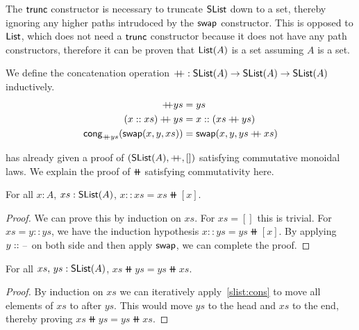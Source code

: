 The $\operatorname{\mathsf{trunc}}$ constructor is necessary to truncate $\operatorname{\mathsf{SList}}$ down to a set,
thereby ignoring any higher paths intrudoced by the $\operatorname{\mathsf{swap}}$ constructor.
This is opposed to $\operatorname{\mathsf{List}}$, which does not need a $\operatorname{\mathsf{trunc}}$ constructor
because it does not have any path constructors, therefore it can be proven that $\operatorname{\mathsf{List}}(A)$
is a set assuming $A$ is a set.

\begin{definition}[Concatenation]
    We define the concatenation operation $\mathbin{+\kern -0.4em+} : \operatorname{\mathsf{SList}}(A) \to \operatorname{\mathsf{SList}}(A) \to \operatorname{\mathsf{SList}}(A)$
    inductively.
    \begin{align*}
        [] \doubleplus ys & = ys \\
        (x :: xs) \doubleplus ys & = x :: (xs \doubleplus ys) \\
        \term{cong}_{\doubleplus ys}(\term{swap}(x, y, xs)) & = \term{swap}(x, y, ys \doubleplus xs)
    \end{align*}
\end{definition}

\cite{choudhuryFreeCommutativeMonoids2023} has already given a proof of $(\operatorname{\mathsf{SList}}(A), \mathbin{+\kern -0.4em+}, [])$
satisfying commutative monoidal laws. We explain the proof of $\doubleplus$ satisfying commutativity here.

\begin{lemma}\label{slist:cons}
    For all $x : A$, $xs : \operatorname{\mathsf{SList}}(A)$, $x :: xs = xs \doubleplus [ x ]$.
\end{lemma}

\begin{proof}
We can prove this by induction on $xs$.
For $xs = []$ this is trivial. For $xs = y :: ys$, we have the induction hypothesis $x :: ys = ys \doubleplus [ x ]$.
By applying $y :: {\scriptstyle{-}}$ on both side and then apply $\operatorname{\mathsf{swap}}$, we can complete the proof.
\end{proof}

\begin{theorem}[Commutativity]\label{slist:comm}
    For all $xs,\,ys : \operatorname{\mathsf{SList}}(A)$, $xs \doubleplus ys = ys \doubleplus xs$.
\end{theorem}

\begin{proof}
    By induction on $xs$ we can iteratively apply~\ref{slist:cons} to move all elements of $xs$
    to after $ys$. This would move $ys$ to the head and $xs$ to the end, thereby proving
    $xs \doubleplus ys = ys \doubleplus xs$.
\end{proof}

